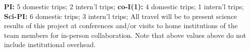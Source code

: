 \documentclass[usenames,dvipsnames,modern]{CLASS_FILES/aastex631}
\begin{document}
\begin{table}[h!]
{     \smallIndent \textbf{PI:} 5 domestic trips; 2 intern'l trips;\newline
     \smallIndent \textbf{co-I(1):} 4 domestic trips; 1 intern'l trips;\newline
     \smallIndent \textbf{Sci-PI:} 6 domestic trips; 3 intern'l trips;\newline
     \newline
     All travel will be to present science results of this project at conferences and/or visits to home institutions of the team members for in-person collaboration. Note that above values above do not include institutional overhead.}
  \label{tab:isANONtravel}
\end{table}

\newpage
\end{document}
